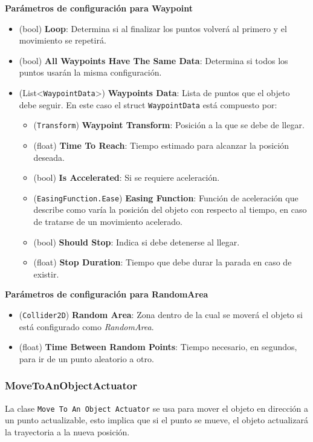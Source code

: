 \textbf{Parámetros de configuración para Waypoint}
\begin{itemize} 	
	\item (bool) \textbf{Loop}: Determina si al finalizar los puntos volverá al primero y el movimiento se repetirá.
	\item (bool) \textbf{All Waypoints Have The Same Data}: Determina si todos los puntos usarán la misma configuración.
	\item (List<\texttt{WaypointData}>) \textbf{Waypoints Data}: Lista de puntos que el objeto debe seguir. En este caso el struct \texttt{WaypointData} está compuesto por:
	\begin{itemize} 	
		\item (\texttt{Transform}) \textbf{Waypoint Transform}: Posición a la que se debe de llegar.
		\item (float) \textbf{Time To Reach}: Tiempo estimado para alcanzar la posición deseada.
		\item (bool) \textbf{Is Accelerated}: Si se requiere aceleración.
		\item (\texttt{EasingFunction.Ease}) \textbf{Easing Function}: Función de aceleración que describe como varía la posición del objeto con respecto al tiempo, en caso de tratarse de un movimiento acelerado.
		\item (bool) \textbf{Should Stop}: Indica si debe detenerse al llegar.
		\item (float) \textbf{Stop Duration}: Tiempo que debe durar la parada en caso de existir.
	\end{itemize}
\end{itemize}

\textbf{Parámetros de configuración para RandomArea}
\begin{itemize} 	
	\item (\texttt{Collider2D}) \textbf{Random Area}: Zona dentro de la cual se moverá el objeto si está configurado como \textit{RandomArea}. 
	\item (float) \textbf{Time Between Random Points}: Tiempo necesario, en segundos, para ir de un punto aleatorio a otro.
\end{itemize}


\subsubsection{MoveToAnObjectActuator}
La clase \texttt{Move To An Object Actuator} se usa para mover el objeto en dirección a un punto actualizable, esto implica que si el punto se mueve, el objeto actualizará la trayectoria a la nueva posición.\\

